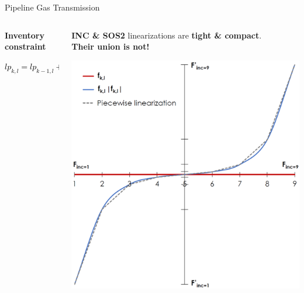 \documentclass[aspectratio=169]{beamer}
\begin{document}
\begin{frame}{Pipeline Gas Transmission}
\begin{columns}
\begin{column}{.39\textwidth}
            \begin{coloredblock}[yellow][][][c][3.5cm]
                \begin{center}
                    \textbf{Inventory constraint}
                    \vspace{.5cm}\par
                    \footnotesize\textcolor{black}{$lp_{k,l}=lp_{k-1,l}+f_{k,l}^{in}-f_{k,l}^{out}~~\forall k,l(m,n)$}
                \end{center}
            \end{coloredblock}
        \end{column}
        \begin{column}{.587\textwidth}
            \begin{coloredblock}[grey]
                \begin{center}
                    \textbf{INC \& SOS2} linearizations are \textbf{tight \& compact}.\\
                    \textbf{Their union is not!}
                \end{center}
            \end{coloredblock}
            \vspace{.3cm}
            \begin{minipage}[t]{.6\textwidth}
                \includegraphics[width=\textwidth]{figures/Gasflow.png}

\end{minipage}
\end{column}
\end{columns}
\end{frame}
\end{document}
